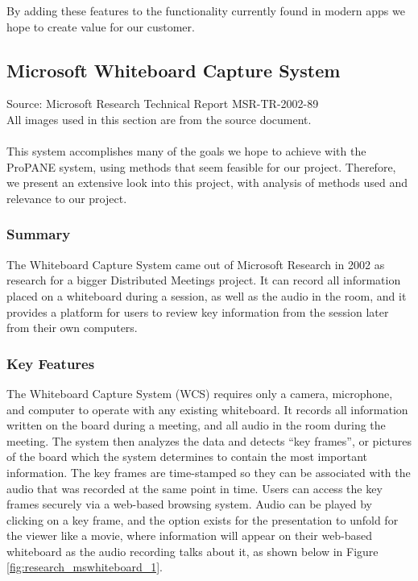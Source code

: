 \documentclass{article}
\begin{document}
By adding these features to the functionality currently found in modern apps we hope to create value for our customer.


			\subsection*{Microsoft Whiteboard Capture System}
Source: Microsoft Research Technical Report MSR-TR-2002-89 \cite{WCS} \\
All images used in this section are from the source document. \\ \\
This system accomplishes many of the goals we hope to achieve with the ProPANE system, using methods that seem feasible for our project.  Therefore, we present an extensive look into this project, with analysis of methods used and relevance to our project.
		\subsubsection*{Summary}
The Whiteboard Capture System came out of Microsoft Research in 2002 as research for a bigger Distributed Meetings project.  It can record all information placed on a whiteboard during a session, as well as the audio in the room, and it provides a platform for users to review key information from the session later from their own computers.  
	
		\subsubsection*{Key Features}
The Whiteboard Capture System (WCS) requires only a camera, microphone, and computer to operate with any existing whiteboard.  It records all information written on the board during a meeting, and all audio in the room during the meeting.  The system then analyzes the data and detects ``key frames'', or pictures of the board which the system determines to contain the most important information.  The key frames are time-stamped so they can be associated with the audio that was recorded at the same point in time.  Users can access the key frames securely via a web-based browsing system.  Audio can be played by clicking on a key frame, and the option exists for the presentation to unfold for the viewer like a movie, where information will appear on their web-based whiteboard as the audio recording talks about it, as shown below in Figure \ref{fig:research_mswhiteboard_1}.
    
\end{document}
